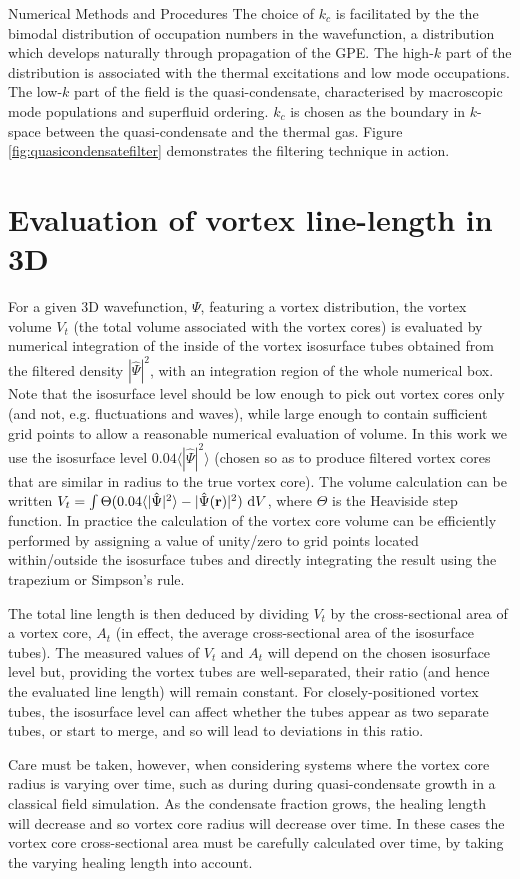 \begin{chapter}{\label{cha:numerics}Numerical Methods and Procedures}
The choice of $k_c$ is facilitated by the the bimodal distribution of occupation numbers in the wavefunction, a distribution which develops naturally through propagation of the GPE. The high-$k$ part of the distribution is associated with the thermal excitations and low mode occupations. The low-$k$ part of the field is the quasi-condensate, characterised by macroscopic mode populations and superfluid ordering. $k_c$ is chosen as the boundary in $k$-space between the quasi-condensate and the thermal gas. Figure \ref{fig:quasicondensatefilter} demonstrates the filtering technique in action.

  	
\section{\label{section:linelength} Evaluation of vortex line-length in 3D}
For a given 3D wavefunction, $\Psi$, featuring a vortex distribution, the vortex volume $V_t$ (the total volume associated with the vortex cores) is evaluated by numerical integration of the inside of the vortex isosurface tubes obtained from the filtered density $|\hat \Psi|^2$, with an integration region of the whole numerical box.  Note that the isosurface level should be low enough to pick out vortex cores only (and not, e.g. fluctuations and waves), while large enough to contain sufficient grid points to allow a reasonable numerical evaluation of volume. In this work we use the isosurface level $0.04\langle |\hat{\Psi}|^2 \rangle$ (chosen so as to produce filtered vortex cores that are similar in radius to the true vortex core).  The volume calculation can be written $V_t = \int \Theta(0.04\langle |\hat{\Psi}|^2 \rangle - |\hat{\Psi}({\bf r})|^2)~{\rm d}V$, where $\Theta$ is the Heaviside step function. In practice the calculation of the vortex core volume can be efficiently performed by assigning a value of unity/zero to grid points located within/outside the isosurface tubes and directly integrating the result using the trapezium or Simpson's rule.

The total line length is then deduced by dividing $V_t$ by the cross-sectional area of a vortex core, $A_t$ (in effect, the average cross-sectional area of the isosurface tubes). The measured values of $V_t$ and $A_t$ will depend on the chosen isosurface level but, providing the vortex tubes are well-separated, their ratio (and hence the evaluated line length) will remain constant.  For closely-positioned vortex tubes, the isosurface level can affect whether the tubes appear as two separate tubes, or start to merge, and so will lead to deviations in this ratio.

Care must be taken, however, when considering systems where the vortex core radius is varying over time, such as during during quasi-condensate growth in a classical field simulation. As the condensate fraction grows, the healing length will decrease and so vortex core radius will decrease over time. In these cases the vortex core cross-sectional area must be carefully calculated over time, by taking the varying healing length into account.
\end{chapter}
